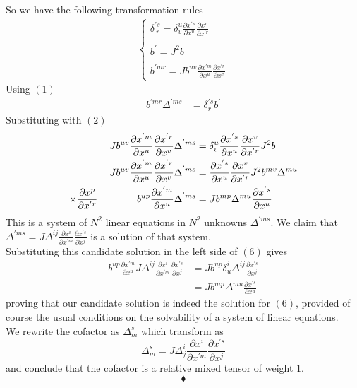 So we have the following transformation rules
\begin{align}
\left\{\begin{array}{l}
\delta^{'s}_{\ r} =  \delta^{u}_v \frac{\partial x^{'s} }{\partial {x^u}}\frac{\partial x^{v} }{\partial x^{'r}}\\\\
b^{'}= J^2 b\\\\
b^{'mr}_{} = J b^{uv}_{}\frac{\partial x^{'m} }{\partial {x^{u}}}\frac{\partial x^{'r} }{\partial x^{v}}
\end{array}\right.
\end{align}
Using $(1)$
\begin{align}
b^{'mr}_{}\Delta^{'ms}&=\delta^{'s}_r b^{'}
\end{align}
Substituting with $(2)$
\begin{align}
Jb^{uv}_{}\frac{\partial x^{'m} }{\partial {x^{u}}}\frac{\partial x^{'r} }{\partial x^{v}}\Delta^{'ms}&=\delta^{u}_v \frac{\partial x^{'s} }{\partial {x^u}}\frac{\partial x^{v} }{\partial x^{'r}} J^2 b\\
Jb^{uv}_{}\frac{\partial x^{'m} }{\partial {x^{u}}}\frac{\partial x^{'r} }{\partial x^{v}}\Delta^{'ms}&=\frac{\partial x^{'s} }{\partial {x^u}}\frac{\partial x^{v} }{\partial x^{'r}} J^2 b^{mv}_{}\Delta^{mu}\\
\times \frac{\partial x^{p} }{\partial x^{'r}}\quad\quad\quad\quad b^{up}_{}\frac{\partial x^{'m} }{\partial {x^{u}}}\Delta^{'ms}&=Jb^{mp}_{}\Delta^{mu}\frac{\partial x^{'s} }{\partial {x^u}}  
\end{align}
This is a system of $N^2$ linear equations in $N^2$ unknowns $\Delta^{'ms}$.  We claim that  $\Delta^{'ms}= J \Delta^{ij}\frac{\partial x^{i} }{\partial {x^{'m}}}\frac{\partial x^{'s} }{\partial x^{j}}$ is a solution of that system.\\
Substituting this candidate solution in the left side of $(6)$ gives
\begin{align}
b^{up}_{}\frac{\partial x^{'m} }{\partial {x^{u}}}J \Delta^{ij}\frac{\partial x^{i} }{\partial {x^{'m}}}\frac{\partial x^{'s} }{\partial x^{j}}&=Jb^{up}_{}\delta^i_u\Delta^{ij}\frac{\partial x^{'s} }{\partial x^{j}}\\
&=Jb^{mp}\Delta^{mu}\frac{\partial x^{'s} }{\partial {x^u}}  
\end{align}
proving that our candidate solution is indeed the solution for $(6)$, provided of course the usual conditions on the solvability of a system of linear equations.\\
We rewrite the cofactor as $\Delta^{s}_{m}$ which transform as $$\Delta^{s}_{m}= J \Delta^{i}_{j}\frac{\partial x^{i} }{\partial {x^{'m}}}\frac{\partial x^{'s} }{\partial x^{j}}$$
and conclude that the cofactor is a relative mixed tensor of weight $1$.
$$\blacklozenge$$
\newpage

